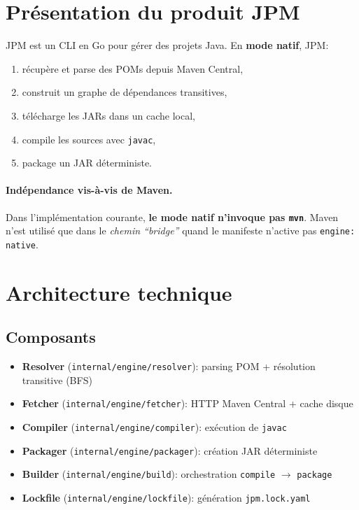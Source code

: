 \documentclass[11pt,a4paper]{article}
\begin{document}
\section{Présentation du produit JPM}
JPM est un CLI en Go pour gérer des projets Java. En \textbf{mode natif}, JPM:
\begin{enumerate}
  \item récupère et parse des POMs depuis Maven Central,
  \item construit un graphe de dépendances transitives,
  \item télécharge les JARs dans un cache local,
  \item compile les sources avec \texttt{javac},
  \item package un JAR déterministe.
\end{enumerate}

\paragraph{Indépendance vis-à-vis de Maven.}
Dans l’implémentation courante, \textbf{le mode natif n’invoque pas \texttt{mvn}}. Maven n’est utilisé que dans le \textit{chemin ``bridge''} quand le manifeste n’active pas \texttt{engine: native}.

\section{Architecture technique}
\subsection{Composants}
\begin{itemize}
  \item \textbf{Resolver} (\texttt{internal/engine/resolver}): parsing POM + résolution transitive (BFS)
  \item \textbf{Fetcher} (\texttt{internal/engine/fetcher}): HTTP Maven Central + cache disque
  \item \textbf{Compiler} (\texttt{internal/engine/compiler}): exécution de \texttt{javac}
  \item \textbf{Packager} (\texttt{internal/engine/packager}): création JAR déterministe
  \item \textbf{Builder} (\texttt{internal/engine/build}): orchestration \texttt{compile} $\rightarrow$ \texttt{package}
  \item \textbf{Lockfile} (\texttt{internal/engine/lockfile}): génération \texttt{jpm.lock.yaml}
\end{itemize}
\end{document}
